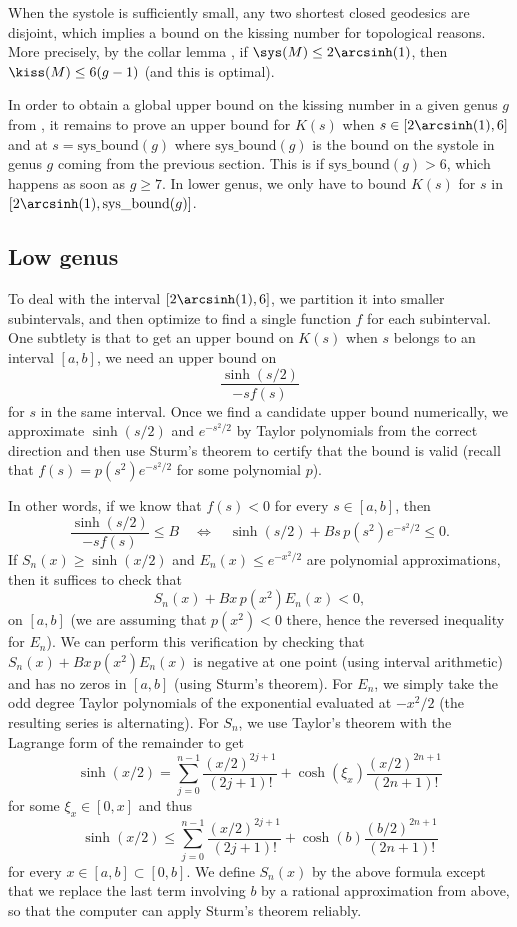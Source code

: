 \documentclass[12pt]{amsart}
\numberwithin{equation}{section}
\begin{document}
When the systole is sufficiently small, any two shortest closed geodesics are disjoint, which implies a bound on the kissing number for topological reasons. More precisely, by the collar lemma  \cite[Theorem 4.1.6]{Buser}, if $\sys(M) \leq 2\arcsinh(1)$, then $\kiss(M) \leq 6(g - 1)$ (and this is optimal).

In order to obtain a global upper bound on the kissing number in a given genus $g$ from , it remains to prove an upper bound for $K(s)$ when $s \in [2\arcsinh(1), 6]$ and at $s=\mathrm{sys\_bound}(g)$ where $\mathrm{sys\_bound}(g)$ is the bound on the systole in genus $g$ coming from the previous section. This is if $\mathrm{sys\_bound}(g)>6$, which happens as soon as $g\geq 7$. In lower genus, we only have to bound $K(s)$ for $s$ in $[2\arcsinh(1),\mathrm{sys\_bound}(g)]$.

\subsection{Low genus}

To deal with the interval $[2\arcsinh(1), 6]$, we partition it into smaller subintervals, and then optimize to find a single function $f$ for each subinterval. One subtlety is that to get an upper bound on $K(s)$ when $s$ belongs to an interval $[a,b]$, we need an upper bound on 
\[
\frac{\sinh(s/2)}{-sf(s)}
\]
for $s$ in the same interval. Once we find a candidate upper bound numerically, we appro\-xi\-mate $\sinh(s/2)$ and $e^{-s^2/2}$ by Taylor polynomials from the correct direction and then use Sturm's theorem to certify that the bound is valid (recall that $f(s) = p(s^2)e^{-s^2/2}$ for some polynomial $p$).

In other words, if we know that $f(s)<0$ for every $s \in [a,b]$, then
\[
 \frac{\sinh(s/2)}{-sf(s)} \leq B  \quad \Longleftrightarrow \quad \sinh(s/2) + Bs \,p(s^2)e^{-s^2/2} \leq 0.
\]
If $S_n(x) \geq \sinh(x/2)$ and $E_n(x) \leq e^{-x^2/2}$ are polynomial approximations, then it suffices to check that
\[
S_n(x) + B x \,p(x^2) E_n(x) < 0,
\]
on $[a,b]$ (we are assuming that $p(x^2)<0$ there, hence the reversed inequality for $E_n$). We can perform this verification by checking that $S_n(x) + B x \,p(x^2) E_n(x)$ is negative at one point (using interval arithmetic) and has no zeros in $[a,b]$ (using Sturm's theorem). For $E_n$, we simply take the odd degree Taylor polynomials of the exponential evaluated at $-x^2/2$ (the resulting series is alternating). For $S_n$, we use Taylor's theorem with the Lagrange form of the remainder to get
\[
\sinh(x/2) = \sum_{j=0}^{n-1} \frac{(x/2)^{2j+1}}{(2j+1)!} + \cosh(\xi_x) \frac{(x/2)^{2n+1}}{(2n+1)!}
\]
for some $\xi_x \in [0, x]$ and thus
\[
\sinh(x/2) \leq \sum_{j=0}^{n-1} \frac{(x/2)^{2j+1}}{(2j+1)!} + \cosh(b) \frac{(b/2)^{2n+1}}{(2n+1)!}
\]
for every $x \in [a,b] \subset [0,b]$. We define $S_n(x)$ by the above formula except that we replace the last term involving $b$ by a rational approximation from above, so that the computer can apply Sturm's theorem reliably.
\end{document}
